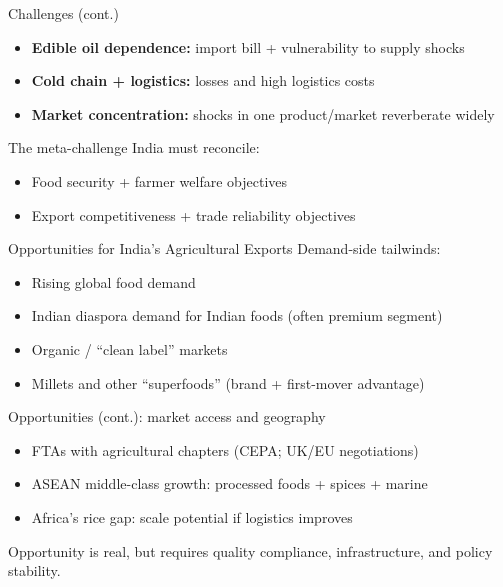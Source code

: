\documentclass[
  ignorenonframetext,
  aspectratio=169,
]{beamer}
\makeatletter
\providecommand{\tightlist}{%
  \setlength{\itemsep}{0pt}\setlength{\parskip}{0pt}}
\let\quarto@originallabel\label
\DeclareRobustCommand*{\label}[1]{\quarto@originallabel{#1}}
\makeatother
\begin{document}
\begin{frame}
\begin{block}{Challenges (cont.)}
\label{challenges-cont.}
\begin{itemize}
\tightlist
\item
  \textbf{Edible oil dependence:} import bill + vulnerability to supply
  shocks
\item
  \textbf{Cold chain + logistics:} losses and high logistics costs
\item
  \textbf{Market concentration:} shocks in one product/market
  reverberate widely
\end{itemize}
\end{block}
\end{frame}

\begin{frame}
\begin{block}{The meta-challenge}
\label{the-meta-challenge}
India must reconcile:

\begin{itemize}
\tightlist
\item
  Food security + farmer welfare objectives
\item
  Export competitiveness + trade reliability objectives
\end{itemize}
\end{block}
\end{frame}

\begin{frame}
\begin{block}{Opportunities for India's Agricultural Exports}
\label{opportunities-for-indias-agricultural-exports}
Demand-side tailwinds:

\begin{itemize}
\tightlist
\item
  Rising global food demand
\item
  Indian diaspora demand for Indian foods (often premium segment)
\item
  Organic / ``clean label'' markets
\item
  Millets and other ``superfoods'' (brand + first-mover advantage)
\end{itemize}
\end{block}
\end{frame}

\begin{frame}
\begin{block}{Opportunities (cont.): market access and geography}
\label{opportunities-cont.-market-access-and-geography}
\begin{itemize}
\tightlist
\item
  FTAs with agricultural chapters (CEPA; UK/EU negotiations)
\item
  ASEAN middle-class growth: processed foods + spices + marine
\item
  Africa's rice gap: scale potential if logistics improves
\end{itemize}

Opportunity is real, but requires quality compliance, infrastructure,
and policy stability.
\end{block}
\end{frame}
\end{document}

